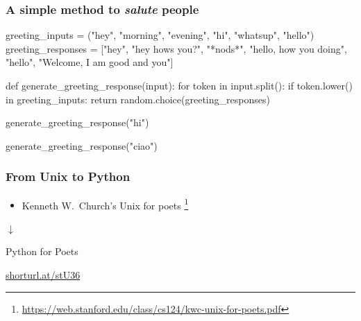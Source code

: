 \documentclass{beamer}
\begin{document}
\begin{frame}[fragile]
\frametitle{A simple method to \textit{salute} people}
\vspace{5mm}

\begin{python}
greeting_inputs = ("hey", "morning", "evening", "hi",
                "whatsup", "hello")
greeting_responses = ["hey", "hey hows you?", "*nods*",
                "hello, how you doing", "hello",
                "Welcome, I am good and you"]

def generate_greeting_response(input):
    for token in input.split():
        if token.lower() in greeting_inputs:
            return random.choice(greeting_responses)
\end{python}
\pause

\begin{python}
generate_greeting_response("hi")
\end{python}
\pause

\begin{python}
generate_greeting_response("ciao")
\end{python}

\end{frame}

\begin{frame}
\frametitle{From Unix to Python}

\begin{itemize}
  \item Kenneth W.\ Church's \alert{Unix for poets}%
  \footnote{\url{https://web.stanford.edu/class/cs124/kwc-unix-for-poets.pdf}}
\end{itemize}
\medskip
\pause

\centering

$\downarrow$
\medskip

\alert{Python for Poets}

\pause

\bigskip
\centering
\url{shorturl.at/stU36}


\end{frame}
\end{document}
